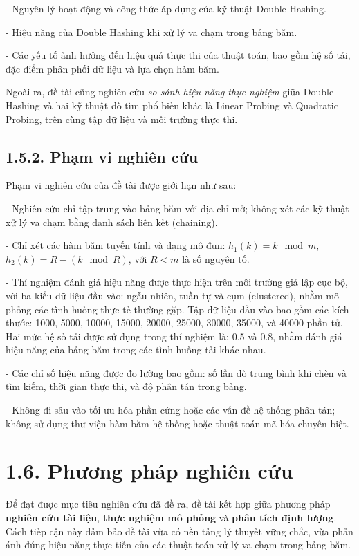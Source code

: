 \documentclass[12pt,a4paper]{report}
\begin{document}
    - Nguyên lý hoạt động và công thức áp dụng của kỹ thuật Double Hashing.
    
    - Hiệu năng của Double Hashing khi xử lý va chạm trong bảng băm.
    
    - Các yếu tố ảnh hưởng đến hiệu quả thực thi của thuật toán, bao gồm hệ số tải, đặc điểm phân phối dữ liệu và lựa chọn hàm băm.

Ngoài ra, đề tài cũng nghiên cứu \textit{so sánh hiệu năng thực nghiệm} giữa Double Hashing và hai kỹ thuật dò tìm phổ biến khác là Linear Probing và Quadratic Probing, trên cùng tập dữ liệu và môi trường thực thi.

\subsection*{1.5.2. Phạm vi nghiên cứu}

\noindent \indent Phạm vi nghiên cứu của đề tài được giới hạn như sau:

    - Nghiên cứu chỉ tập trung vào bảng băm với địa chỉ mở; không xét các kỹ thuật xử lý va chạm bằng danh sách liên kết (chaining).
    
    - Chỉ xét các hàm băm tuyến tính và dạng mô đun: $h_1(k) = k \mod m$, $h_2(k) = R - (k \mod R)$, với $R < m$ là số nguyên tố.
    
    - Thí nghiệm đánh giá hiệu năng được thực hiện trên môi trường giả lập cục bộ, với ba kiểu dữ liệu đầu vào: ngẫu nhiên, tuần tự và cụm (clustered), nhằm mô phỏng các tình huống thực tế thường gặp. Tập dữ liệu đầu vào bao gồm các kích thước: 1000, 5000, 10000, 15000, 20000, 25000, 30000, 35000, và 40000 phần tử. Hai mức hệ số tải được sử dụng trong thí nghiệm là: 0.5 và 0.8, nhằm đánh giá hiệu năng của bảng băm trong các tình huống tải khác nhau.
    
    - Các chỉ số hiệu năng được đo lường bao gồm: số lần dò trung bình khi chèn và tìm kiếm, thời gian thực thi, và độ phân tán trong bảng.
    
    - Không đi sâu vào tối ưu hóa phần cứng hoặc các vấn đề hệ thống phân tán; không sử dụng thư viện hàm băm hệ thống hoặc thuật toán mã hóa chuyên biệt.


\section*{1.6. Phương pháp nghiên cứu}

\noindent \indent Để đạt được mục tiêu nghiên cứu đã đề ra, đề tài kết hợp giữa phương pháp \textbf{nghiên cứu tài liệu}, \textbf{thực nghiệm mô phỏng} và \textbf{phân tích định lượng}. Cách tiếp cận này đảm bảo đề tài vừa có nền tảng lý thuyết vững chắc, vừa phản ánh đúng hiệu năng thực tiễn của các thuật toán xử lý va chạm trong bảng băm.
\end{document}
